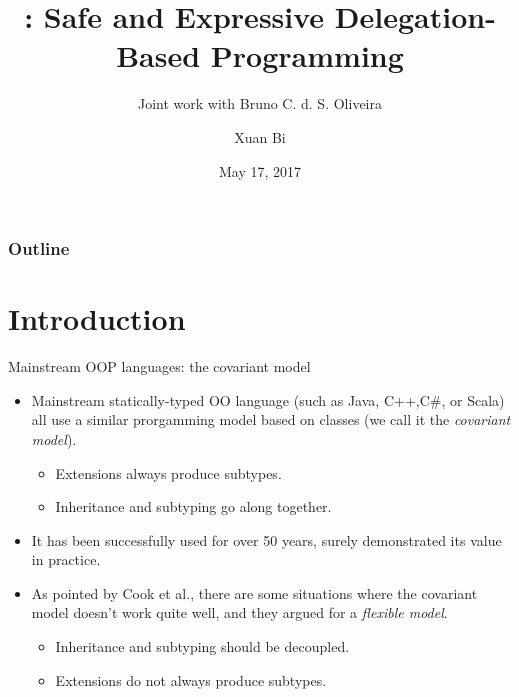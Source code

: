 \documentclass{beamer}
\title[\name]{\name: Safe and Expressive Delegation-Based Programming}
\subtitle{Joint work with Bruno C. d. S. Oliveira}
\date{May 17, 2017}
\author{Xuan Bi}
\institute{The University of Hong Kong}
\begin{document}
\maketitle

\begin{frame}
  \frametitle{Outline}
  \tableofcontents
\end{frame}


\section{Introduction}

\begin{frame}{Mainstream OOP languages: the covariant model}

  \begin{itemize}
  \item<1-> Mainstream statically-typed OO language (such as Java, C++,C\#, or
    Scala) all use a similar prorgamming model based on classes (we call it
    the \textit{covariant model}).
    \begin{itemize}
    \item Extensions always produce subtypes.
    \item Inheritance and subtyping go along together.
    \end{itemize}

  \item<2-> It has been successfully used for over 50 years, surely demonstrated
    its value in practice.

  \item<3-> As pointed by Cook et al., there are some situations where the
    covariant model doesn't work quite well, and they argued for a
    \textit{flexible model}.
    \begin{itemize}
    \item Inheritance and subtyping should be decoupled.
    \item Extensions do not always produce subtypes.
    \end{itemize}


  \end{itemize}


\end{frame}
\end{document}

